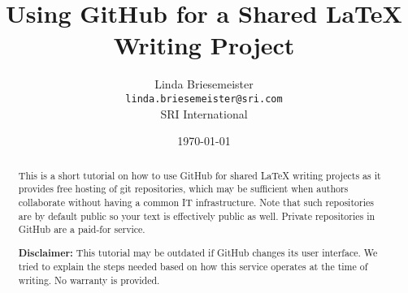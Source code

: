 \documentclass{article}
\title{Using GitHub\textsuperscript{\textcopyright} for a Shared \LaTeX{} Writing Project}
\author{%
Linda Briesemeister\\
\texttt{linda.briesemeister@sri.com}\\
SRI International
}
\date{\today}
\begin{document}
\maketitle

\begin{abstract}
This is a short tutorial on how to use GitHub for shared LaTeX writing projects as it provides free hosting of git repositories, which may be sufficient when authors collaborate without having a common IT infrastructure.  Note that such repositories are by default public so your text is effectively public as well.  Private repositories in GitHub are a paid-for service.

\textbf{Disclaimer:} This tutorial may be outdated if GitHub changes its user interface.  We tried to explain the steps needed based on how this service operates at the time of writing.  No warranty is provided.
\end{abstract}

\tableofcontents

\clearpage

\pagestyle{fancy}




%
%
%
\end{document}
